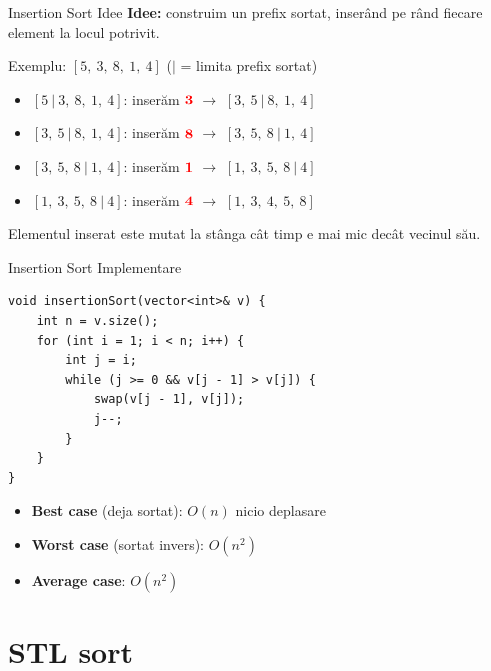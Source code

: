 ﻿\documentclass{beamer}
\begin{document}
\begin{frame}{Insertion Sort \textemdash{} Idee}
  \textbf{Idee:} construim un prefix sortat, inserând pe rând fiecare element la locul potrivit.
  \bigskip

  Exemplu: $[5,\ 3,\ 8,\ 1,\ 4]$ \quad ($|$ = limita prefix sortat)
  \begin{itemize}
    \item $[5\ |\ 3,\ 8,\ 1,\ 4]$: inserăm $\textcolor{red}{\mathbf{3}}$ $\rightarrow$ $[3,\ 5\ |\ 8,\ 1,\ 4]$
    \item $[3,\ 5\ |\ 8,\ 1,\ 4]$: inserăm $\textcolor{red}{\mathbf{8}}$ $\rightarrow$ $[3,\ 5,\ 8\ |\ 1,\ 4]$
    \item $[3,\ 5,\ 8\ |\ 1,\ 4]$: inserăm $\textcolor{red}{\mathbf{1}}$ $\rightarrow$ $[1,\ 3,\ 5,\ 8\ |\ 4]$
    \item $[1,\ 3,\ 5,\ 8\ |\ 4]$: inserăm $\textcolor{red}{\mathbf{4}}$ $\rightarrow$ $[1,\ 3,\ 4,\ 5,\ 8]$ \checkmark
  \end{itemize}
  \medskip
  Elementul inserat este mutat la stânga cât timp e mai mic decât vecinul său.
\end{frame}

\begin{frame}[fragile]{Insertion Sort \textemdash{} Implementare}
  \begin{lstlisting}
void insertionSort(vector<int>& v) {
    int n = v.size();
    for (int i = 1; i < n; i++) {
        int j = i;
        while (j >= 0 && v[j - 1] > v[j]) {
            swap(v[j - 1], v[j]);
            j--;
        }
    }
}
  \end{lstlisting}
  \begin{itemize}
    \item \textbf{Best case} (deja sortat): $O(n)$ \textemdash{} nicio deplasare
    \item \textbf{Worst case} (sortat invers): $O(n^2)$
    \item \textbf{Average case}: $O(n^2)$
  \end{itemize}
\end{frame}

\section{STL sort}
\end{document}
